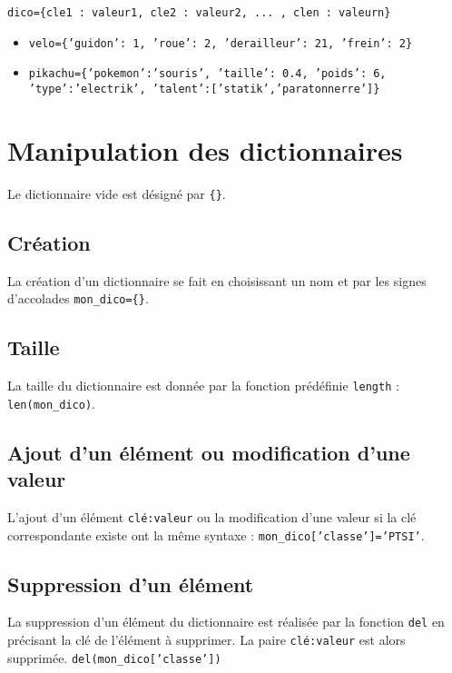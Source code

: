 \begin{center}
\texttt{dico=\{cle1 : valeur1, cle2 : valeur2, ... , clen : valeurn\}}
\end{center}

\begin{exemple}
\begin{itemize}
\item \texttt{velo=\{'guidon': 1, 'roue': 2, 'derailleur': 21, 'frein': 2\}}
\item \texttt{pikachu=\{'pokemon':'souris', 'taille': 0.4, 'poids': 6, 'type':'electrik', 'talent':['statik','paratonnerre']\}}
\end{itemize}
\end{exemple}

\section{Manipulation des dictionnaires}
Le dictionnaire vide est désigné par \texttt{\{\}}.
\subsection*{Création}
La création d'un dictionnaire se fait en choisissant un nom et par les signes d'accolades
\texttt{mon\_dico=\{\}}.

\subsection*{Taille}
La taille du dictionnaire est donnée par la fonction prédéfinie \lstinline{length} : 
\lstinline{len(mon_dico)}.


\subsection*{Ajout d'un élément ou modification d'une valeur}
L'ajout d'un élément \texttt{clé:valeur} ou la modification d'une valeur si la clé correspondante existe ont la même syntaxe : \texttt{mon\_dico['classe']='PTSI'}. 

\subsection*{Suppression d'un élément}
La suppression d'un élément du dictionnaire est réalisée par la fonction \texttt{del} en précisant la clé de l'élément à supprimer. La paire \texttt{clé:valeur} est alors supprimée.
\texttt{del(mon\_dico['classe'])}


